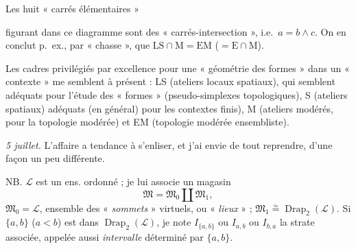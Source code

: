 \documentclass[11pt,a4paper]{article}
\begin{document}
Les huit « carrés élémentaires »


figurant dans ce diagramme sont des « carrés-intersection », i.e.\ $a = b \wedge c$. On en conclut p.~ex., par « chasse », que $\mathrm{LS} \cap \mathrm{M} = \mathrm{EM}$ ($= \mathrm{E} \cap \mathrm{M}$).

\struck{\ill{}}

Les cadres privilégiés par excellence pour une « géométrie des formes » dans un « contexte »  me semblent à présent : LS (ateliers locaux  spatiaux), \struck{\ill{}} qui semblent adéquats pour l'étude des \struck{\ill{}} «  formes » (pseudo-simplexes topologiques), S (ateliers spatiaux) adéquats (en général) pour les contextes finis), M (ateliers modérés, pour la topologie modérée) et EM (topologie modérée ensembliste).




\emph{5 juillet.} L'affaire a tendance à s'enliser, et j'ai envie de tout reprendre, d'une façon  un peu différente.

NB. $\mathcal{L}$ est un ens. ordonné ; je lui associe un magasin \struck{\ill{}}
\[
  \mathfrak{M} = \mathfrak{M}_0 \amalg \mathfrak{M}_1 ,
\]
$\mathfrak{M}_0 = \mathcal{L}$, ensemble des « \emph{sommets} » virtuels, ou « \emph{lieux} » ; $\mathfrak{M}_1 \overset{\simeq}{=} \operatorname{Drap}_2(\mathcal{L})$. Si $\{a,b\}$ ($a<b$) est dans $\operatorname{Drap}_2(\mathcal{L})$, je note $I_{\{a,b\}}$ ou $I_{a,b}$ ou $I_{b,a}$ la strate associée, appelée aussi \emph{intervalle} déterminé par $\{a,b\}$.
\end{document}
